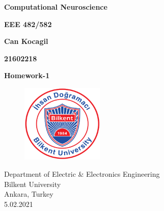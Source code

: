 \documentclass[12pt]{amsart}
\begin{document}
\begin{titlepage}
   \begin{center}
       \vspace*{1cm}

       \textbf{Computational Neuroscience}

       \vspace{0.7cm}
        \textbf{EEE 482/582}
            
       \vspace{0.7cm}

       \textbf{Can Kocagil} 
       
       \vspace{0.7cm}
       \textbf{21602218}

       \vspace{0.7cm}
            
       \textbf{Homework-1}
            
       \vspace{0.8cm}
         \begin{figure}[h]
            \centering
            \includegraphics[width = 0.35\textwidth]{images/bilkent_logo.png}
        \end{figure}
       \vspace{0.7cm}  
       Department of Electric \& Electronics Engineering \\
       \vspace{0.7cm}
       Bilkent University\\
       \vspace{0.7cm}
       Ankara, Turkey \\
       \vspace{0.7cm}
       5.02.2021
            
   \end{center}
\end{titlepage}

\tableofcontents
\listoffigures
\listoftables
\lstlistoflistings
\end{document}
